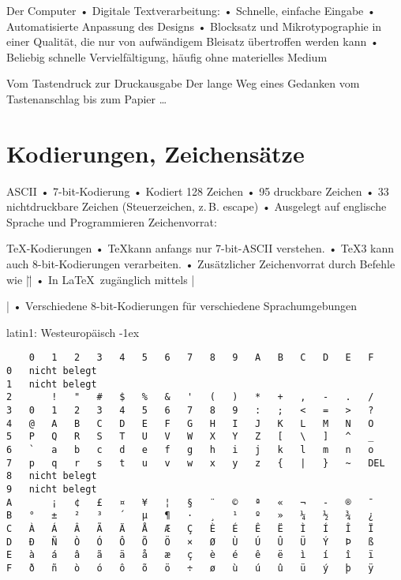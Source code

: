 \begin{frame}{Der Computer}
• Digitale Textverarbeitung:
• Schnelle, einfache Eingabe
• Automatisierte Anpassung des Designs
• Blocksatz und Mikrotypographie in einer Qualität, die nur von aufwändigem Bleisatz übertroffen werden kann
• Beliebig schnelle Vervielfältigung, häufig ohne materielles Medium
\•
\end{frame}

\begin{frame}{Vom Tastendruck zur Druckausgabe}
Der lange Weg eines Gedanken vom Tastenanschlag bis zum Papier …
\end{frame}


\section{Kodierungen, Zeichensätze}
\begin{frame}[fragile]{ASCII}
• 7-bit-Kodierung
• Kodiert 128 Zeichen
• 95 druckbare Zeichen
• 33 nichtdruckbare Zeichen (Steuerzeichen, z.\,B. escape)
• Ausgelegt auf englische Sprache und Programmieren
\• 
Zeichenvorrat:
\begin{verbatim*}
 !"#$%&'()*+,-./0123456789:;<=>?
@ABCDEFGHIJKLMNOPQRSTUVWXYZ[\]^_
`abcdefghijklmnopqrstuvwxyz{|}~ 
\end{verbatim*}
\end{frame}

\begin{frame}[fragile]{\TeX-Kodierungen}
• \TeX kann anfangs nur 7-bit-ASCII verstehen.
• \TeX3 kann auch 8-bit-Kodierungen verarbeiten.
• Zusätzlicher Zeichenvorrat durch Befehle wie |\"|
• In \LaTeX\ zugänglich mittels |\usepackage[kodierung]{inputenc}|
• Verschiedene 8-bit-Kodierungen für verschiedene Sprachumgebungen
\•
\end{frame}

\begin{frame}[fragile]{latin1: Westeuropäisch}
\kern-1ex\small
\begin{verbatim}
  	0 	1 	2 	3 	4 	5 	6 	7 	8 	9 	A 	B 	C 	D 	E 	F
0 	nicht belegt
1 	nicht belegt
2 	 	! 	" 	# 	$ 	% 	& 	' 	( 	) 	* 	+ 	, 	- 	. 	/
3 	0 	1 	2 	3 	4 	5 	6 	7 	8 	9 	: 	; 	< 	= 	> 	?
4 	@ 	A 	B 	C 	D 	E 	F 	G 	H 	I 	J 	K 	L 	M 	N 	O
5 	P 	Q 	R 	S 	T 	U 	V 	W 	X 	Y 	Z 	[ 	\ 	] 	^ 	_
6 	` 	a 	b 	c 	d 	e 	f 	g 	h 	i 	j 	k 	l 	m 	n 	o
7 	p 	q 	r 	s 	t 	u 	v 	w 	x 	y 	z 	{ 	| 	} 	~ 	DEL
8 	nicht belegt
9 	nicht belegt
A 	  	¡ 	¢ 	£ 	¤ 	¥ 	¦ 	§ 	¨ 	© 	ª 	« 	¬ 	-  	® 	¯
B 	° 	± 	² 	³ 	´ 	µ 	¶ 	· 	¸ 	¹ 	º 	» 	¼ 	½ 	¾ 	¿
C 	À 	Á 	Â 	Ã 	Ä 	Å 	Æ 	Ç 	È 	É 	Ê 	Ë 	Ì 	Í 	Î 	Ï
D 	Ð 	Ñ 	Ò 	Ó 	Ô 	Õ 	Ö 	× 	Ø 	Ù 	Ú 	Û 	Ü 	Ý 	Þ 	ß
E 	à 	á 	â 	ã 	ä 	å 	æ 	ç 	è 	é 	ê 	ë 	ì 	í 	î 	ï
F 	ð 	ñ 	ò 	ó 	ô 	õ 	ö 	÷ 	ø 	ù 	ú 	û 	ü 	ý 	þ 	ÿ
\end{verbatim}
\end{frame}

